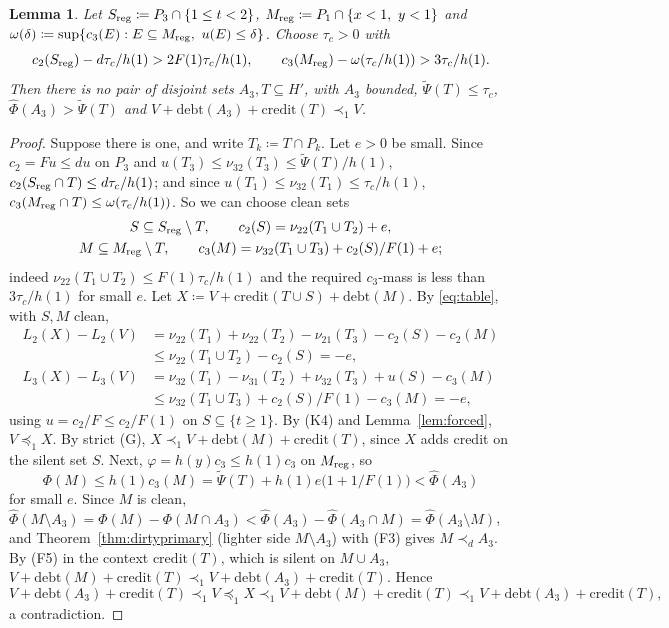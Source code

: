 \documentclass[11pt]{article}
\newtheorem{lemma}[theorem]{Lemma}
\theoremstyle{definition}\newtheorem{definition}[theorem]{Definition}
\theoremstyle{remark}\newtheorem{remark}[theorem]{Remark}
\newcommand{\debt}{\mathrm{debt}}
\newcommand{\cred}{\mathrm{credit}}
\newcommand{\Phihat}{\widehat\Phi}
\newcommand{\Psitil}{\widetilde\Psi}
\begin{document}
\begin{lemma}\label{lem:Vcap}
Let $S_{\rm reg}\coloneqq P_3\cap\{1\le t<2\}$, $M_{\rm reg}\coloneqq
P_1\cap\{x<1,\ y<1\}$ and $\omega(\delta)\coloneqq\sup\{c_3(E):E\subseteq
M_{\rm reg},\ u(E)\le\delta\}$. Choose $\tau_c>0$ with
\[
 c_2(S_{\rm reg})-d\tau_c/h(1)>2F(1)\tau_c/h(1),\qquad
 c_3(M_{\rm reg})-\omega(\tau_c/h(1))>3\tau_c/h(1).
\]
Then there is no pair of disjoint sets $A_3,T\subseteq H'$, with $A_3$
bounded, $\Psitil(T)\le\tau_c$, $\Phihat(A_3)>\Psitil(T)$ and
$V+\debt(A_3)+\cred(T)\prec_1V$.
\end{lemma}
\begin{proof}
Suppose there is one, and write $T_k\coloneqq T\cap P_k$. Let $e>0$ be
small. Since $c_2=Fu\le du$ on $P_3$ and $u(T_3)\le\nu_{32}(T_3)\le
\Psitil(T)/h(1)$, $c_2(S_{\rm reg}\cap T)\le d\tau_c/h(1)$; and since
$u(T_1)\le\nu_{32}(T_1)\le\tau_c/h(1)$, $c_3(M_{\rm reg}\cap T)\le
\omega(\tau_c/h(1))$. So we can choose clean sets
\begin{gather*}
 S\subseteq S_{\rm reg}\setminus T,\qquad c_2(S)=\nu_{22}(T_1\cup T_2)+e,\\
 M\subseteq M_{\rm reg}\setminus T,\qquad c_3(M)=\nu_{32}(T_1\cup T_3)+
 c_2(S)/F(1)+e;
\end{gather*}
indeed $\nu_{22}(T_1\cup T_2)\le F(1)\tau_c/h(1)$ and the required $c_3$-mass
is less than $3\tau_c/h(1)$ for small $e$. Let $X\coloneqq
V+\cred(T\cup S)+\debt(M)$. By \eqref{eq:table}, with $S,M$ clean,
\begin{align*}
 L_2(X)-L_2(V)&=\nu_{22}(T_1)+\nu_{22}(T_2)-\nu_{21}(T_3)-c_2(S)-c_2(M)\\
 &\le\nu_{22}(T_1\cup T_2)-c_2(S)=-e,\\
 L_3(X)-L_3(V)&=\nu_{32}(T_1)-\nu_{31}(T_2)+\nu_{32}(T_3)+u(S)-c_3(M)\\
 &\le\nu_{32}(T_1\cup T_3)+c_2(S)/F(1)-c_3(M)=-e,
\end{align*}
using $u=c_2/F\le c_2/F(1)$ on $S\subseteq\{t\ge1\}$. By (K4) and
Lemma~\ref{lem:forced}, $V\preceq_1X$. By strict (G),
$X\prec_1V+\debt(M)+\cred(T)$, since $X$ adds credit on the silent set $S$.
Next, $\varphi=h(y)c_3\le h(1)c_3$ on $M_{\rm reg}$, so
\[
 \Phi(M)\le h(1)c_3(M)=\Psitil(T)+h(1)e\bigl(1+1/F(1)\bigr)<\Phihat(A_3)
\]
for small $e$. Since $M$ is clean, $\Phihat(M\setminus A_3)=\Phi(M)-\Phi(M\cap
A_3)<\Phihat(A_3)-\Phihat(A_3\cap M)=\Phihat(A_3\setminus M)$, and
Theorem~\ref{thm:dirtyprimary} (lighter side $M\setminus A_3$) with (F3) gives
$M\prec_dA_3$. By (F5) in the context $\cred(T)$, which is silent on $M\cup
A_3$, $V+\debt(M)+\cred(T)\prec_1V+\debt(A_3)+\cred(T)$. Hence
\[
 V+\debt(A_3)+\cred(T)\prec_1V\preceq_1X\prec_1V+\debt(M)+\cred(T)\prec_1
 V+\debt(A_3)+\cred(T),
\]
a contradiction.
\end{proof}
\end{document}
